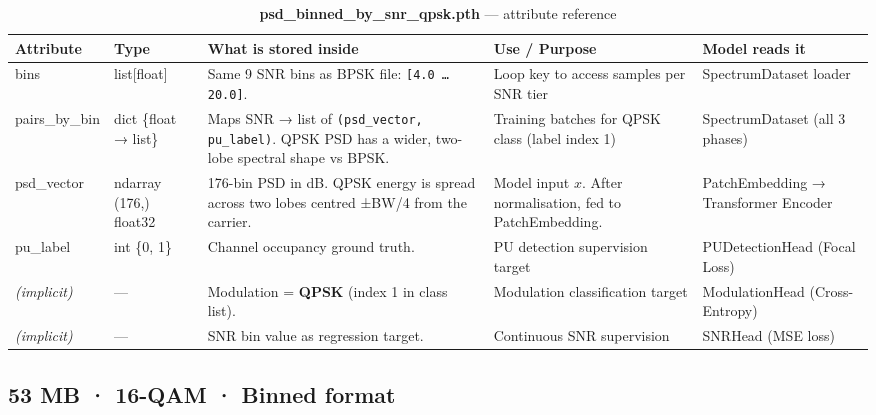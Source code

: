 \documentclass[11pt,a4paper]{article}
\begin{document}
\begin{table}[h!]
\centering
\caption{\textbf{psd\_binned\_by\_snr\_qpsk.pth} — attribute reference}
\renewcommand{\arraystretch}{1.55}
\begin{tabularx}{\textwidth}{>{\ttfamily\small}l l X l l}
\toprule
\textbf{Attribute} & \textbf{Type} & \textbf{What is stored inside} & \textbf{Use / Purpose} & \textbf{Model reads it} \\
\midrule

bins
  & list[float]
  & Same 9 SNR bins as BPSK file: \texttt{[4.0 … 20.0]}.
  & Loop key to access samples per SNR tier
  & SpectrumDataset loader \\[6pt]

pairs\_by\_bin
  & dict \{float → list\}
  & Maps SNR → list of \texttt{(psd\_vector, pu\_label)}.
    QPSK PSD has a wider, two-lobe spectral shape vs BPSK.
  & Training batches for QPSK class (label index 1)
  & SpectrumDataset (all 3 phases) \\[6pt]

\quad psd\_vector
  & ndarray (176,) float32
  & 176-bin PSD in dB. QPSK energy is spread across two lobes
    centred ±BW/4 from the carrier.
  & Model input $x$. After normalisation, fed to PatchEmbedding.
  & PatchEmbedding → Transformer Encoder \\[6pt]

\quad pu\_label
  & int \{0, 1\}
  & Channel occupancy ground truth.
  & PU detection supervision target
  & PUDetectionHead (Focal Loss) \\[6pt]

\textit{(implicit)}
  & —
  & Modulation = \textbf{QPSK} (index 1 in class list).
  & Modulation classification target
  & ModulationHead (Cross-Entropy) \\[6pt]

\textit{(implicit)}
  & —
  & SNR bin value as regression target.
  & Continuous SNR supervision
  & SNRHead (MSE loss) \\

\bottomrule
\end{tabularx}
\end{table}

\subsection*{
\hfill\small 53 MB · 16-QAM · Binned format}
\end{document}
